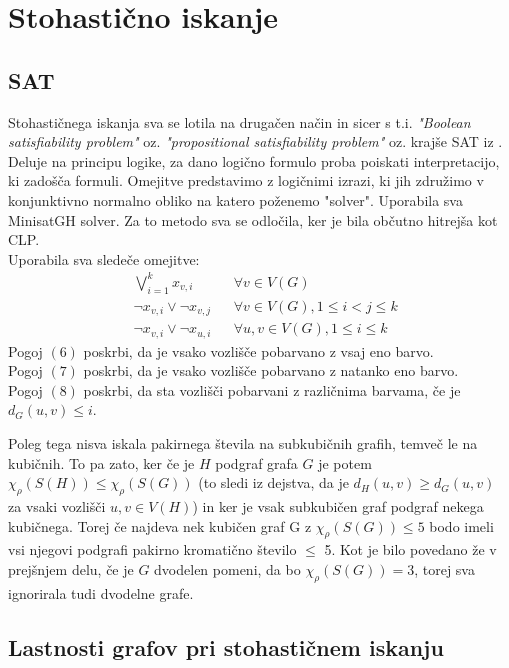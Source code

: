 \documentclass[11pt,a4paper,titlepage]{article}
\begin{document}
\section{Stohastično iskanje}

\subsection{SAT}

Stohastičnega iskanja sva se lotila na drugačen način in sicer s t.i. \emph{"Boolean satisfiability problem"} oz. \emph{"propositional satisfiability problem"} oz.
krajše SAT iz \cite{SHAO20153588}. Deluje na principu logike, za dano logično formulo proba poiskati interpretacijo, ki zadošča formuli.  Omejitve predstavimo z logičnimi izrazi, ki jih
združimo v konjunktivno normalno obliko na katero poženemo "\textnormal{solver}". Uporabila sva MinisatGH solver. Za to metodo sva se odločila, ker je bila občutno
hitrejša kot CLP.\\
Uporabila sva sledeče omejitve:
\begin{align}
	\label{eq:f.5} & \bigvee_{i=1}^k x_{v, i} && \forall v\in V(G) \\
	\label{eq:f.6} & \neg x_{v, i} \lor \neg x_{v, j} && \forall v \in V(G), 1 \leq i < j \leq k\\
	\label{eq:f.7} & \neg x_{v, i} \lor \neg x_{u, i} && \forall u, v \in V(G), 1 \leq i \leq k
\end{align}
Pogoj $(6)$ poskrbi, da je vsako vozlišče pobarvano z vsaj eno barvo. \\
Pogoj $(7)$ poskrbi, da je vsako vozlišče pobarvano z natanko eno barvo. \\
Pogoj $(8)$ poskrbi, da sta vozlišči pobarvani z različnima barvama, če je $d_G(u, v) \leq i$.

Poleg tega nisva iskala pakirnega števila na subkubičnih grafih, temveč le na kubičnih. To pa zato, ker če je $H$ podgraf grafa $G$ je potem
$\chi_\rho(S(H)) \leq \chi_\rho(S(G))$ (to sledi iz dejstva, da je $d_H(u, v) \geq d_G(u, v)$ za vsaki vozlišči $u, v \in V(H)$) in ker je
vsak subkubičen graf podgraf nekega kubičnega. Torej če najdeva nek kubičen graf G z $\chi_\rho(S(G)) \leq 5$ bodo imeli vsi njegovi podgrafi pakirno kromatično število $\leq$ 5. Kot je bilo povedano že v prejšnjem delu, če je $G$ dvodelen pomeni, da bo $\chi_\rho(S(G)) = 3$, torej
sva ignorirala tudi dvodelne grafe.

\subsection{Lastnosti grafov pri stohastičnem iskanju}
\end{document}

